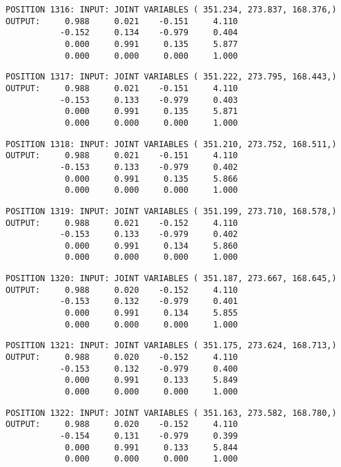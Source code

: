 \begin{verbatim}
POSITION 1316: INPUT: JOINT VARIABLES ( 351.234, 273.837, 168.376,)
OUTPUT:     0.988     0.021    -0.151     4.110
           -0.152     0.134    -0.979     0.404
            0.000     0.991     0.135     5.877
            0.000     0.000     0.000     1.000
\end{verbatim} \pagebreak[1]\begin{verbatim}
POSITION 1317: INPUT: JOINT VARIABLES ( 351.222, 273.795, 168.443,)
OUTPUT:     0.988     0.021    -0.151     4.110
           -0.153     0.133    -0.979     0.403
            0.000     0.991     0.135     5.871
            0.000     0.000     0.000     1.000
\end{verbatim} \pagebreak[1]\begin{verbatim}
POSITION 1318: INPUT: JOINT VARIABLES ( 351.210, 273.752, 168.511,)
OUTPUT:     0.988     0.021    -0.151     4.110
           -0.153     0.133    -0.979     0.402
            0.000     0.991     0.135     5.866
            0.000     0.000     0.000     1.000
\end{verbatim} \pagebreak[1]\begin{verbatim}
POSITION 1319: INPUT: JOINT VARIABLES ( 351.199, 273.710, 168.578,)
OUTPUT:     0.988     0.021    -0.152     4.110
           -0.153     0.133    -0.979     0.402
            0.000     0.991     0.134     5.860
            0.000     0.000     0.000     1.000
\end{verbatim} \pagebreak[1]\begin{verbatim}
POSITION 1320: INPUT: JOINT VARIABLES ( 351.187, 273.667, 168.645,)
OUTPUT:     0.988     0.020    -0.152     4.110
           -0.153     0.132    -0.979     0.401
            0.000     0.991     0.134     5.855
            0.000     0.000     0.000     1.000
\end{verbatim} \pagebreak[1]\begin{verbatim}
POSITION 1321: INPUT: JOINT VARIABLES ( 351.175, 273.624, 168.713,)
OUTPUT:     0.988     0.020    -0.152     4.110
           -0.153     0.132    -0.979     0.400
            0.000     0.991     0.133     5.849
            0.000     0.000     0.000     1.000
\end{verbatim} \pagebreak[1]\begin{verbatim}
POSITION 1322: INPUT: JOINT VARIABLES ( 351.163, 273.582, 168.780,)
OUTPUT:     0.988     0.020    -0.152     4.110
           -0.154     0.131    -0.979     0.399
            0.000     0.991     0.133     5.844
            0.000     0.000     0.000     1.000
\end{verbatim} \pagebreak[1]\begin{verbatim}

\end{verbatim}
